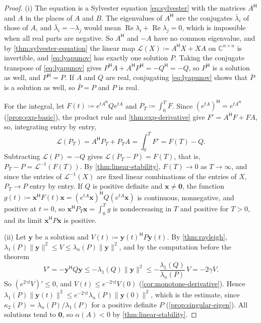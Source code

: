 \begin{proof}
(i) The equation is a Sylvester equation \eqref{eq:sylvester} with the matrices $A^{\mathsf H}$ and $A$ in the places of $A$ and $B$. The eigenvalues of $A^{\mathsf H}$ are the conjugates $\bar\lambda_i$ of those of $A$, and $\bar\lambda_i=-\lambda_j$ would mean $\operatorname{Re}\lambda_i+\operatorname{Re}\lambda_j=0$, which is impossible when all real parts are negative. So $A^{\mathsf H}$ and $-A$ have no common eigenvalue, and by \cref{thm:sylvester-equation} the linear map $\mathcal L(X)\coloneqq A^{\mathsf H}X+XA$ on $\mathbb C^{n\times n}$ is invertible, and \eqref{eq:lyapunov} has exactly one solution $P$. Taking the conjugate transpose of \eqref{eq:lyapunov} gives $P^{\mathsf H}A+A^{\mathsf H}P^{\mathsf H}=-Q^{\mathsf H}=-Q$, so $P^{\mathsf H}$ is a solution as well, and $P^{\mathsf H}=P$. If $A$ and $Q$ are real, conjugating \eqref{eq:lyapunov} shows that $\bar P$ is a solution as well, so $\bar P=P$ and $P$ is real.

For the integral, let $F(t)\coloneqq e^{tA^{\mathsf H}}Qe^{tA}$ and $P_T\coloneqq\int_0^TF$. Since $(e^{tA})^{\mathsf H}=e^{tA^{\mathsf H}}$ (\cref{prop:exp-basic}), the product rule and \cref{thm:exp-derivative} give $F'=A^{\mathsf H}F+FA$, so, integrating entry by entry,
\[
\mathcal L(P_T)=A^{\mathsf H}P_T+P_TA=\int_0^TF'=F(T)-Q .
\]
Subtracting $\mathcal L(P)=-Q$ gives $\mathcal L(P_T-P)=F(T)$, that is, $P_T-P=\mathcal L^{-1}(F(T))$. By \cref{thm:linear-stability}, $F(T)\to0$ as $T\to\infty$, and since the entries of $\mathcal L^{-1}(X)$ are fixed linear combinations of the entries of $X$, $P_T\to P$ entry by entry. If $Q$ is positive definite and $\mathbf x\ne\mathbf 0$, the function $g(t)\coloneqq\mathbf x^{\mathsf H}F(t)\mathbf x=(e^{tA}\mathbf x)^{\mathsf H}Q(e^{tA}\mathbf x)$ is continuous, nonnegative, and positive at $t=0$, so $\mathbf x^{\mathsf H}P_T\mathbf x=\int_0^Tg$ is nondecreasing in $T$ and positive for $T>0$, and its limit $\mathbf x^{\mathsf H}P\mathbf x$ is positive.

(ii) Let $\mathbf y$ be a solution and $V(t)\coloneqq\mathbf y(t)^{\mathsf H}P\mathbf y(t)$. By \cref{thm:rayleigh}, $\lambda_1(P)\|\mathbf y\|^2\le V\le\lambda_n(P)\|\mathbf y\|^2$, and by the computation before the theorem
\[
V'=-\mathbf y^{\mathsf H}Q\mathbf y\le-\lambda_1(Q)\|\mathbf y\|^2\le-\frac{\lambda_1(Q)}{\lambda_n(P)}\,V=-2\gamma V .
\]
So $(e^{2\gamma t}V)'\le0$, and $V(t)\le e^{-2\gamma t}V(0)$ (\cref{cor:monotone-derivative}). Hence $\lambda_1(P)\|\mathbf y(t)\|^2\le e^{-2\gamma t}\lambda_n(P)\|\mathbf y(0)\|^2$, which is the estimate, since $\kappa_2(P)=\lambda_n(P)/\lambda_1(P)$ for a positive definite $P$ (\cref{prop:singular-eigen}). All solutions tend to $\mathbf 0$, so $\alpha(A)<0$ by \cref{thm:linear-stability}.
\end{proof}

